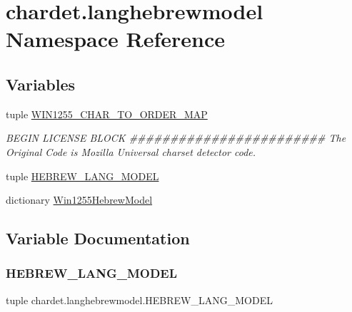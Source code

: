 \hypertarget{namespacechardet_1_1langhebrewmodel}{}\section{chardet.\+langhebrewmodel Namespace Reference}
\label{namespacechardet_1_1langhebrewmodel}
\subsection*{Variables}
\begin{DoxyCompactItemize}
\item 
tuple \hyperlink{namespacechardet_1_1langhebrewmodel_a22e0ac1d842eded550c3a760233aa627}{W\+I\+N1255\+\_\+\+C\+H\+A\+R\+\_\+\+T\+O\+\_\+\+O\+R\+D\+E\+R\+\_\+\+M\+AP}
\begin{DoxyCompactList}\small\item\em B\+E\+G\+IN L\+I\+C\+E\+N\+SE B\+L\+O\+CK \#\#\#\#\#\#\#\#\#\#\#\#\#\#\#\#\#\#\#\#\#\#\#\# The Original Code is Mozilla Universal charset detector code. \end{DoxyCompactList}\item 
tuple \hyperlink{namespacechardet_1_1langhebrewmodel_aa245d1f2769770923f0a0e24cbbc990d}{H\+E\+B\+R\+E\+W\+\_\+\+L\+A\+N\+G\+\_\+\+M\+O\+D\+EL}
\item 
dictionary \hyperlink{namespacechardet_1_1langhebrewmodel_a3bae8f37774840ed77062f4578fb66b5}{Win1255\+Hebrew\+Model}
\end{DoxyCompactItemize}


\subsection{Variable Documentation}
\mbox{\label{namespacechardet_1_1langhebrewmodel_aa245d1f2769770923f0a0e24cbbc990d}} 
\subsubsection{\texorpdfstring{H\+E\+B\+R\+E\+W\+\_\+\+L\+A\+N\+G\+\_\+\+M\+O\+D\+EL}{HEBREW\_LANG\_MODEL}}
{\footnotesize\ttfamily tuple chardet.\+langhebrewmodel.\+H\+E\+B\+R\+E\+W\+\_\+\+L\+A\+N\+G\+\_\+\+M\+O\+D\+EL}


